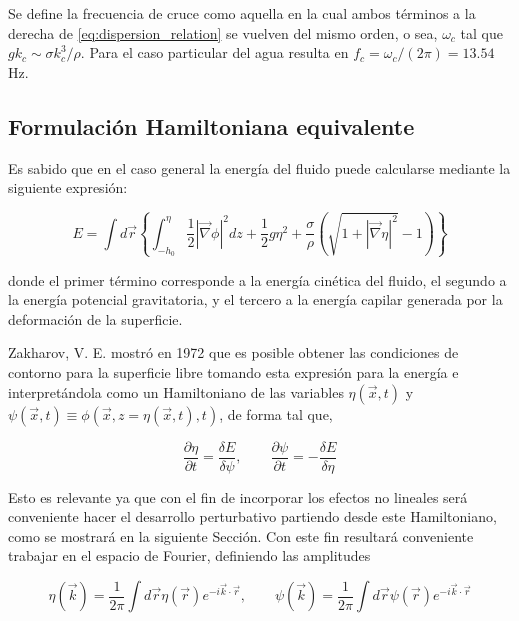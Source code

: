 Se define la frecuencia de cruce como aquella en la cual ambos términos a la derecha de \eqref{eq:dispersion_relation} se vuelven del mismo orden, o sea, $\omega_c$ tal que $gk_c\sim\sigma k_c^3/\rho$. Para el caso particular del agua resulta en $f_c=\omega_c/(2\pi)=13.54$ Hz. %

\subsection{Formulación Hamiltoniana equivalente} %
Es sabido que en el caso general la energía del fluido puede calcularse mediante la siguiente expresión: 

\begin{equation}
	E = \int d\vec r \left\{\int_{-h_0}^{\eta}  \frac{1}{2}|\vec\nabla\phi|^2dz + \frac{1}{2}g\eta^2+\frac{\sigma}{\rho}\left(\sqrt{1+|\vec\nabla\eta|^2}-1\right)\right\} 
	\label{eq:gravity-capillary_energy} %
\end{equation} 
 
\noindent donde el primer término corresponde a la energía cinética del fluido, el segundo a la energía potencial gravitatoria, y el tercero a la energía capilar generada por la deformación de la superficie. 

Zakharov, V. E. mostró en 1972 \cite{zakharovStabilityPeriodicWaves1972a} que es posible obtener las condiciones de contorno para la superficie libre tomando esta expresión para la energía e interpretándola como un Hamiltoniano de las variables $\eta(\vec x, t)$ y $\psi(\vec x, t)\equiv\phi(\vec x, z=\eta(\vec x, t), t)$, de forma tal que,   %

\begin{equation}
	\frac{\partial\eta}{\partial t} = \frac{\delta E}{\delta\psi}, \qquad \frac{\partial\psi}{\partial t} = -\frac{\delta E}{\delta\eta}  %
\end{equation} 

Esto es relevante ya que con el fin de incorporar los efectos no lineales será conveniente hacer el desarrollo perturbativo partiendo desde este Hamiltoniano, como se mostrará en la siguiente Sección. Con este fin resultará conveniente trabajar en el espacio de Fourier, definiendo las amplitudes 
 
\begin{equation}
	\eta(\vec k) = \frac{1}{2\pi} \int d\vec r \eta(\vec r) e^{-i\vec k\cdot\vec r}, \qquad \psi(\vec k) = \frac{1}{2\pi} \int d\vec r \psi(\vec r) e^{-i\vec k\cdot\vec r} %
\end{equation}

